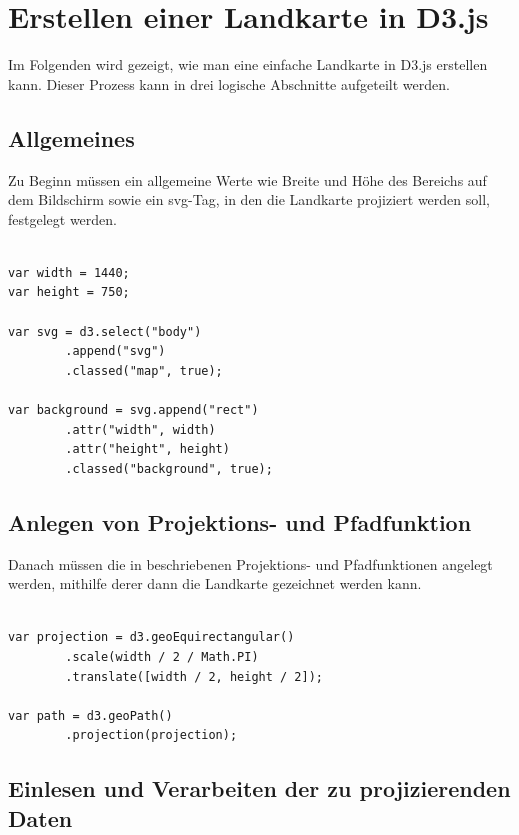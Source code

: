 \chapter{Erstellen einer Landkarte in D3.js}
\label{ch:map-in-d3js}

\nocite{blocksmercator:2018}

Im Folgenden wird gezeigt, wie man eine einfache Landkarte in D3.js erstellen kann. Dieser Prozess kann in drei logische Abschnitte aufgeteilt werden.

\section{Allgemeines}
\label{sec:map-abstract}

Zu Beginn müssen ein allgemeine Werte wie Breite und Höhe des Bereichs auf dem Bildschirm sowie ein svg-Tag, in den die Landkarte projiziert werden soll, festgelegt werden.

\begin{lstlisting}

var width = 1440;
var height = 750;

var svg = d3.select("body")
        .append("svg")
        .classed("map", true);

var background = svg.append("rect")
        .attr("width", width)
        .attr("height", height)
        .classed("background", true);

\end{lstlisting}

\section{Anlegen von Projektions- und Pfadfunktion}
\label{sec:map-setup}

Danach müssen die in beschriebenen Projektions- und Pfadfunktionen angelegt werden, mithilfe derer dann die Landkarte gezeichnet werden kann.

\begin{lstlisting}

var projection = d3.geoEquirectangular()
        .scale(width / 2 / Math.PI)
        .translate([width / 2, height / 2]);

var path = d3.geoPath()
        .projection(projection);

\end{lstlisting}

\section{Einlesen und Verarbeiten der zu projizierenden Daten}

